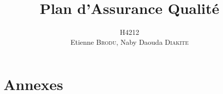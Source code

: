 \documentclass[a4paper,11pt]{article}
\title{Plan d'Assurance Qualité}
\author{H4212\\Etienne \textsc{Brodu}, Naby Daouda \textsc{Diakite}}
\begin{document}
\maketitle
\newpage

\tableofcontents



\section{Annexes}

    

	

    

    

    
\end{document}
